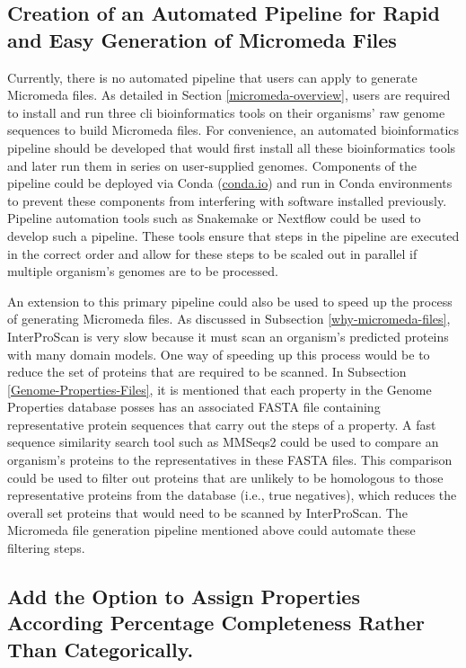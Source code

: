 \subsection{Creation of an Automated Pipeline for Rapid and Easy Generation of Micromeda Files} \label{pipeline-development}

Currently, there is no automated pipeline that users can apply to generate Micromeda files. As detailed in Section \ref{micromeda-overview}, users are required to install and run three \gls{cli} bioinformatics tools on their organisms' raw genome sequences to build Micromeda files. For convenience, an automated bioinformatics pipeline should be developed that would first install all these bioinformatics tools and later run them in series on user-supplied genomes. Components of the pipeline could be deployed via Conda (\href{http://conda.io}{conda.io}) and run in Conda environments to prevent these components from interfering with software installed previously. Pipeline automation tools such as Snakemake \cite{koster2012snakemake} or Nextflow \cite{di2017nextflow} could be used to develop such a pipeline. These tools ensure that steps in the pipeline are executed in the correct order and allow for these steps to be scaled out in parallel if multiple organism's genomes are to be processed.

An extension to this primary pipeline could also be used to speed up the process of generating Micromeda files. As discussed in Subsection \ref{why-micromeda-files}, InterProScan is very slow because it must scan an organism's predicted proteins with many domain models. One way of speeding up this process would be to reduce the set of proteins that are required to be scanned. In Subsection \ref{Genome-Properties-Files}, it is mentioned that each property in the Genome Properties database posses has an associated FASTA file containing representative protein sequences that carry out the steps of a property. A fast sequence similarity search tool such as MMSeqs2 \cite{steinegger2017mmseqs2} could be used to compare an organism's proteins to the representatives in these FASTA files. This comparison could be used to filter out proteins that are unlikely to be homologous to those representative proteins from the database (i.e., true negatives), which reduces the overall set proteins that would need to be scanned by InterProScan. The Micromeda file generation pipeline mentioned above could automate these filtering steps.

\subsection{Add the Option to Assign Properties According Percentage Completeness Rather Than Categorically.}

